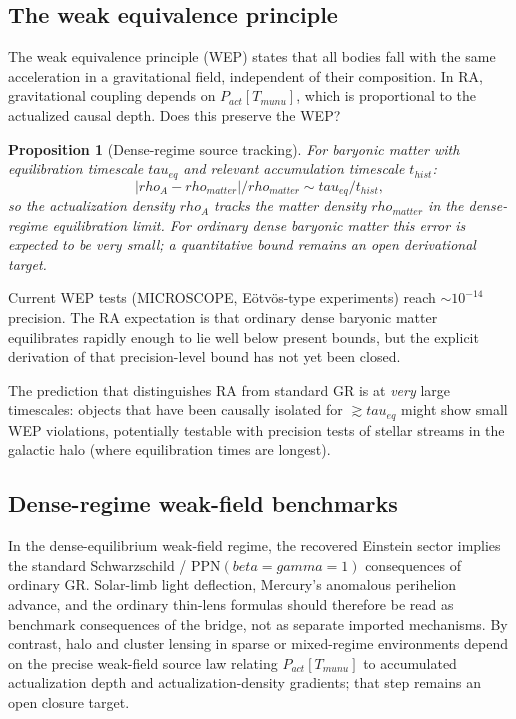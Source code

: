 \documentclass[11pt]{article}
\def\rho{rho}%
\def\mu{mu}%
\def\beta{beta}%
\def\gamma{gamma}%
\def\tau{tau}%
\def\nu{nu}%
\def\mathrm#1{#1}%
\def\frac#1#2{#1/#2}%
\newtheorem{proposition}{Proposition}
\begin{document}
\subsection{The weak equivalence principle}
\label{sec:wep}

The weak equivalence principle (WEP) states that all bodies fall with the same acceleration in a gravitational field, independent of their composition. In RA, gravitational coupling depends on $P_{\mathrm{act}}[T_{\mu\nu}]$, which is proportional to the actualized causal depth. Does this preserve the WEP?

\begin{proposition}[Dense-regime source tracking]
\label{prop:wep}
For baryonic matter with equilibration timescale $\tau_{\mathrm{eq}}$ and relevant accumulation timescale $t_{\mathrm{hist}}$:
\begin{equation}
\frac{|\rho_{\mathrm{A}} - \rho_{\mathrm{matter}}|}{\rho_{\mathrm{matter}}} \sim \frac{\tau_{\mathrm{eq}}}{t_{\mathrm{hist}}},
\end{equation}
so the actualization density $\rho_{\mathrm{A}}$ tracks the matter density $\rho_{\mathrm{matter}}$ in the dense-regime equilibration limit. For ordinary dense baryonic matter this error is expected to be very small; a quantitative bound remains an open derivational target.
\end{proposition}

Current WEP tests (MICROSCOPE, E\"otv\"os-type experiments) reach $\sim 10^{-14}$ precision. The RA expectation is that ordinary dense baryonic matter equilibrates rapidly enough to lie well below present bounds, but the explicit derivation of that precision-level bound has not yet been closed.

The prediction that distinguishes RA from standard GR is at \emph{very} large timescales: objects that have been causally isolated for $\gtrsim \tau_{\mathrm{eq}}$ might show small WEP violations, potentially testable with precision tests of stellar streams in the galactic halo (where equilibration times are longest).

\subsection{Dense-regime weak-field benchmarks}
\label{sec:dense_weak_field_benchmarks}

In the dense-equilibrium weak-field regime, the recovered Einstein sector implies the standard Schwarzschild / PPN$(\beta=\gamma=1)$ consequences of ordinary GR. Solar-limb light deflection, Mercury's anomalous perihelion advance, and the ordinary thin-lens formulas should therefore be read as benchmark consequences of the bridge, not as separate imported mechanisms. By contrast, halo and cluster lensing in sparse or mixed-regime environments depend on the precise weak-field source law relating $P_{\mathrm{act}}[T_{\mu\nu}]$ to accumulated actualization depth and actualization-density gradients; that step remains an open closure target.
\end{document}
